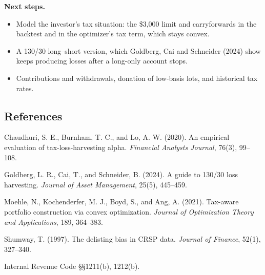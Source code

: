 \documentclass[
  11pt,
]{article}
\providecommand{\tightlist}{%
  \setlength{\itemsep}{0pt}\setlength{\parskip}{0pt}}
\begin{document}
\textbf{Next steps.}

\begin{itemize}
\tightlist
\item
  Model the investor's tax situation: the \$3,000 limit and carryforwards in the backtest and in the optimizer's tax term, which stays convex.
\item
  A 130/30 long--short version, which Goldberg, Cai and Schneider (2024) show keeps producing losses after a long-only account stops.
\item
  Contributions and withdrawals, donation of low-basis lots, and historical tax rates.
\end{itemize}

\hypertarget{references}{%
\subsection{References}\label{references}}
\small

Chaudhuri, S. E., Burnham, T. C., and Lo, A. W. (2020). An empirical evaluation of tax-loss-harvesting alpha. \emph{Financial Analysts Journal}, 76(3), 99--108.

Goldberg, L. R., Cai, T., and Schneider, B. (2024). A guide to 130/30 loss harvesting. \emph{Journal of Asset Management}, 25(5), 445--459.

Moehle, N., Kochenderfer, M. J., Boyd, S., and Ang, A. (2021). Tax-aware portfolio construction via convex optimization. \emph{Journal of Optimization Theory and Applications}, 189, 364--383.

Shumway, T. (1997). The delisting bias in CRSP data. \emph{Journal of Finance}, 52(1), 327--340.

Internal Revenue Code §§1211(b), 1212(b).
\end{document}
